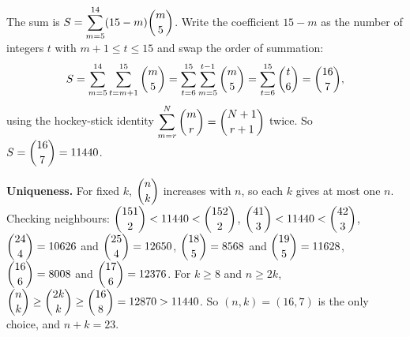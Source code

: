 The sum is $S=\displaystyle\sum_{m=5}^{14}(15-m)\dbinom m5$. Write the coefficient $15-m$ as the number of integers $t$ with $m+1\le t\le15$ and swap the order of summation:
\[S=\sum_{m=5}^{14}\sum_{t=m+1}^{15}\dbinom m5=\sum_{t=6}^{15}\sum_{m=5}^{t-1}\dbinom m5=\sum_{t=6}^{15}\dbinom t6=\dbinom{16}{7},\]
using the hockey-stick identity $\displaystyle\sum_{m=r}^{N}\dbinom mr=\dbinom{N+1}{r+1}$ twice. So $S=\dbinom{16}7=11440$.

\textbf{Uniqueness.} For fixed $k$, $\dbinom nk$ increases with $n$, so each $k$ gives at most one $n$. Checking neighbours: $\dbinom{151}{2}<11440<\dbinom{152}{2}$, $\dbinom{41}{3}<11440<\dbinom{42}{3}$, $\dbinom{24}{4}=10626$ and $\dbinom{25}{4}=12650$, $\dbinom{18}{5}=8568$ and $\dbinom{19}{5}=11628$, $\dbinom{16}{6}=8008$ and $\dbinom{17}{6}=12376$. For $k\ge8$ and $n\ge2k$, $\dbinom nk\ge\dbinom{2k}{k}\ge\dbinom{16}{8}=12870>11440$. So $(n,k)=(16,7)$ is the only choice, and $n+k=\boxed{23}$.
